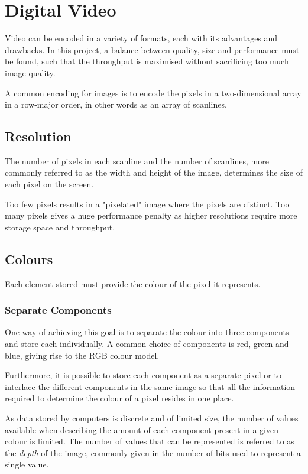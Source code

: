 \section{Digital Video} \label{sec:DigitalVideo}
Video can be encoded in a variety of formats, each with its advantages and drawbacks.
In this project, a balance between quality, size and performance must be found, such that the throughput is maximised without sacrificing too much image quality.

A common encoding for images is to encode the pixels in a two-dimensional array in a row-major order, in other words as an array of scanlines.

\subsection{Resolution}
The number of pixels in each scanline and the number of scanlines, more commonly referred to as the width and height of the image, determines the size of each pixel on the screen.

Too few pixels results in a "pixelated" image where the pixels are distinct.
Too many pixels gives a huge performance penalty as higher resolutions require more storage space and throughput.

\subsection{Colours}
Each element stored must provide the colour of the pixel it represents.

\subsubsection{Separate Components}
One way of achieving this goal is to separate the colour into three components and store each individually.
A common choice of components is red, green and blue, giving rise to the RGB colour model.

Furthermore, it is possible to store each component as a separate pixel or to interlace the different components in the same image so that all the information required to determine the colour of a pixel resides in one place.

As data stored by computers is discrete and of limited size, the number of values available when describing the amount of each component present in a given colour is limited.
The number of values that can be represented is referred to as the \textit{depth} of the image, commonly given in the number of bits used to represent a single value.

